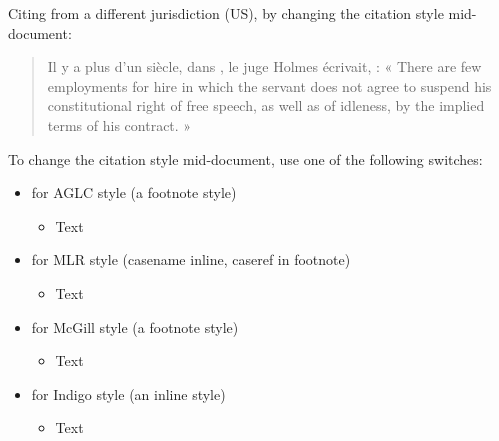 \p Citing from a different jurisdiction (US), by changing the citation style mid-document:
\begin{quotation}
Il y a plus d’un siècle, dans \lcsetstyleindigo{}\marginpar{$\leftarrow$ \sffamily\small\lccurrentstyle}\lcsetstylemcgill, le juge Holmes écrivait,  : « There are few employments for hire in which the servant does not agree to suspend his constitutional right of free speech, as well as of idleness, by the implied terms of his contract. »
\end{quotation}

\p {}To change the citation style mid-document, use one of the following switches:
\citetrackerfalse
\begin{itemize}
\item {} for AGLC style (a footnote style)
\begin{itemize}
\item \lcsetstyleaglc Text
\end{itemize}
\item {} for MLR style (casename inline, caseref in footnote)
\begin{itemize}
\item \lcsetstylemlr  Text 
\end{itemize}
\item {} for McGill style (a footnote style)
\begin{itemize}
\item \lcsetstylemcgill  Text
\end{itemize}
\item {} for Indigo style (an inline style)
\begin{itemize}
\item \lcsetstyleindigo  Text 
\end{itemize}
\end{itemize}
\citetrackerfalse
\lcsetstylemcgill

